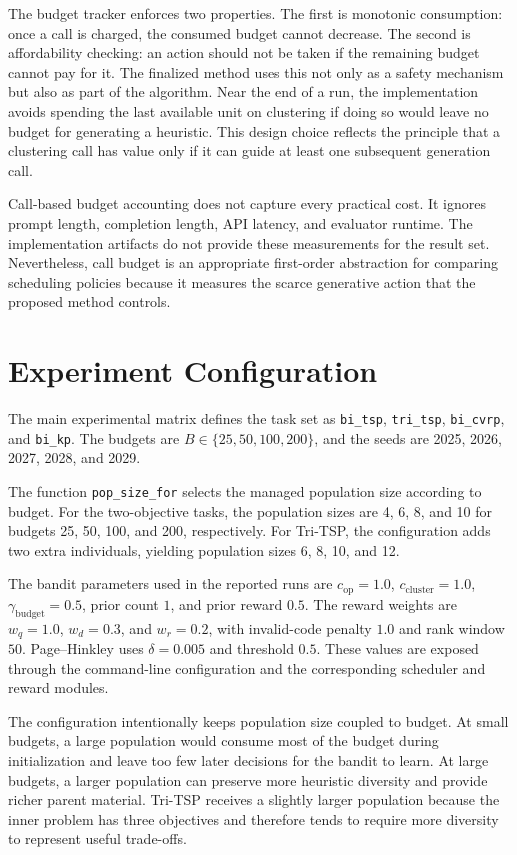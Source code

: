The budget tracker enforces two properties. The first is monotonic consumption: once a call is charged, the consumed budget cannot decrease. The second is affordability checking: an action should not be taken if the remaining budget cannot pay for it. The finalized method uses this not only as a safety mechanism but also as part of the algorithm. Near the end of a run, the implementation avoids spending the last available unit on clustering if doing so would leave no budget for generating a heuristic. This design choice reflects the principle that a clustering call has value only if it can guide at least one subsequent generation call.

Call-based budget accounting does not capture every practical cost. It ignores prompt length, completion length, API latency, and evaluator runtime. The implementation artifacts do not provide these measurements for the result set. Nevertheless, call budget is an appropriate first-order abstraction for comparing scheduling policies because it measures the scarce generative action that the proposed method controls.

\section{Experiment Configuration}

The main experimental matrix defines the task set as \texttt{bi\_tsp}, \texttt{tri\_tsp}, \texttt{bi\_cvrp}, and \texttt{bi\_kp}. The budgets are $B \in \{25,50,100,200\}$, and the seeds are 2025, 2026, 2027, 2028, and 2029.

The function \texttt{pop\_size\_for} selects the managed population size according to budget. For the two-objective tasks, the population sizes are 4, 6, 8, and 10 for budgets 25, 50, 100, and 200, respectively. For Tri-TSP, the configuration adds two extra individuals, yielding population sizes 6, 8, 10, and 12.

The bandit parameters used in the reported runs are $c_{\mathrm{op}}=1.0$, $c_{\mathrm{cluster}}=1.0$, $\gamma_{\mathrm{budget}}=0.5$, prior count $1$, and prior reward $0.5$. The reward weights are $w_q=1.0$, $w_d=0.3$, and $w_r=0.2$, with invalid-code penalty $1.0$ and rank window $50$. Page--Hinkley uses $\delta=0.005$ and threshold $0.5$. These values are exposed through the command-line configuration and the corresponding scheduler and reward modules.

The configuration intentionally keeps population size coupled to budget. At small budgets, a large population would consume most of the budget during initialization and leave too few later decisions for the bandit to learn. At large budgets, a larger population can preserve more heuristic diversity and provide richer parent material. Tri-TSP receives a slightly larger population because the inner problem has three objectives and therefore tends to require more diversity to represent useful trade-offs.

